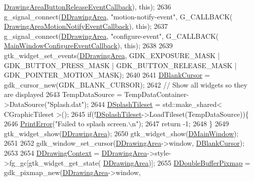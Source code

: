 \begin{DoxyCode}
      \hyperlink{classCApplicationData_a2708d2083c8c2e7c8de126b40eb17b3f}{DrawingAreaButtonReleaseEventCallback}), \textcolor{keyword}{this});
2636     g\_signal\_connect(\hyperlink{classCApplicationData_a4735f5d31632313e0b2a1659eb178987}{DDrawingArea}, \textcolor{stringliteral}{"motion-notify-event"}, G\_CALLBACK(
      \hyperlink{classCApplicationData_a463a4bc8eabe67f9f22c46d96f5eff88}{DrawingAreaMotionNotifyEventCallback}), \textcolor{keyword}{this});
2637     g\_signal\_connect(\hyperlink{classCApplicationData_a4735f5d31632313e0b2a1659eb178987}{DDrawingArea}, \textcolor{stringliteral}{"configure-event"}, G\_CALLBACK(
      \hyperlink{classCApplicationData_a31b48405b43d73cabca4c080c1b9beee}{MainWindowConfigureEventCallback}), \textcolor{keyword}{this});
2638     
2639     gtk\_widget\_set\_events(\hyperlink{classCApplicationData_a4735f5d31632313e0b2a1659eb178987}{DDrawingArea}, GDK\_EXPOSURE\_MASK | GDK\_BUTTON\_PRESS\_MASK | 
      GDK\_BUTTON\_RELEASE\_MASK | GDK\_POINTER\_MOTION\_MASK);
2640     
2641     \hyperlink{classCApplicationData_a34b9a8bb2c85704fb4bd07209acdcdc4}{DBlankCursor} = gdk\_cursor\_new(GDK\_BLANK\_CURSOR);
2642     \textcolor{comment}{// Show all widgets so they are displayed}
2643     TempDataSource = TempDataContainer->DataSource(\textcolor{stringliteral}{"Splash.dat"});
2644     \hyperlink{classCApplicationData_aea23915b726e1a5aa68a309109679ae1}{DSplashTileset} = std::make\_shared< CGraphicTileset >();
2645     \textcolor{keywordflow}{if}(!\hyperlink{classCApplicationData_aea23915b726e1a5aa68a309109679ae1}{DSplashTileset}->LoadTileset(TempDataSource))\{
2646         \hyperlink{Debug_8h_a2ed825eefefe35baf59a93a8c641323d}{PrintError}(\textcolor{stringliteral}{"Failed to splash screen.\(\backslash\)n"});
2647         \textcolor{keywordflow}{return} -1;
2648     \}
2649     gtk\_widget\_show(\hyperlink{classCApplicationData_a4735f5d31632313e0b2a1659eb178987}{DDrawingArea});           
2650     gtk\_widget\_show(\hyperlink{classCApplicationData_af3c57a84b4ecca8a7f86b67a0ae55372}{DMainWindow});
2651     
2652     gdk\_window\_set\_cursor(\hyperlink{classCApplicationData_a4735f5d31632313e0b2a1659eb178987}{DDrawingArea}->window, \hyperlink{classCApplicationData_a34b9a8bb2c85704fb4bd07209acdcdc4}{DBlankCursor}); 
2653     
2654     \hyperlink{classCApplicationData_aa6c5bea9bdcc64398e5a3f693661d37c}{DDrawingContext} = \hyperlink{classCApplicationData_a4735f5d31632313e0b2a1659eb178987}{DDrawingArea}->style->fg\_gc[gtk\_widget\_get\_state(
      \hyperlink{classCApplicationData_a4735f5d31632313e0b2a1659eb178987}{DDrawingArea})];
2655     \hyperlink{classCApplicationData_aefb64ec5ca3f791f6d431cfc56b9f3b3}{DDoubleBufferPixmap} = gdk\_pixmap\_new(\hyperlink{classCApplicationData_a4735f5d31632313e0b2a1659eb178987}{DDrawingArea}->window, 

\end{DoxyCode}

